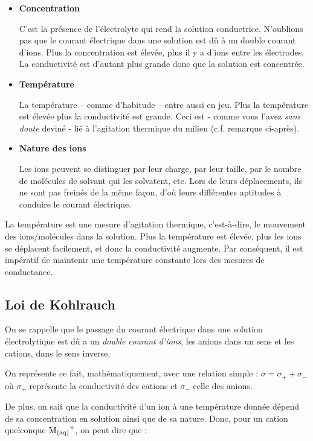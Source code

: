 \documentclass[11pt,a4paper]{article}
\begin{document}
\begin{itemize}
    \item \textbf{Concentration}
    
    C’est la présence de l’électrolyte qui rend la solution conductrice.  N’oublions pas que le courant électrique dans une solution est dû à un double courant d’ions.  Plus la concentration est élevée, plus il y a d’ions entre les électrodes. La conductivité est d’autant plus grande donc que la solution est concentrée.  
    \item \textbf{Température}
    
    La température – comme d’habitude – entre aussi en jeu.  Plus la température est  élevée plus la conductivité est grande. Ceci est - comme vous l'avez \textit{sans doute} deviné - lié à l'agitation thermique du milieu (c.f. remarque ci-après). 
    
    \item \textbf{Nature des ions}
    
    Les ions peuvent se distinguer par leur charge, par leur taille, par le nombre de molécules de solvant qui les solvatent, etc.  Lors de leurs déplacements, ils ne sont pas freinés de la même façon, d’où leurs différentes aptitudes à conduire le courant électrique. 
\end{itemize}
\begin{rmrq}
La température est une mesure d’agitation thermique, c'est-à-dire, le mouvement des ions/molécules dans la solution.  Plus la température est élevée, plus les ions se déplacent facilement, et donc la conductivité augmente.  Par conséquent, il est impératif de maintenir une température constante lors des mesures de conductance. 
\end{rmrq}

\subsection{Loi de Kohlrauch}
On se rappelle que le passage du courant électrique dans une solution électrolytique est dû a un \textit{double courant d’ions}, les anions dans un sens et les cations, dans le sens inverse.  

On représente ce fait, mathématiquement, avec une relation simple : $\sigma= \sigma_+ + \sigma_-$  où $\sigma_+$  représente la conductivité des cations et $\sigma_-$ celle des anions. 

De plus, on sait que la conductivité d’un ion à une température donnée dépend de sa concentration en solution ainsi que de sa nature.  Donc, pour un cation quelconque $\ce{M_{(aq)}^+}$, on peut dire que :
\end{document}
